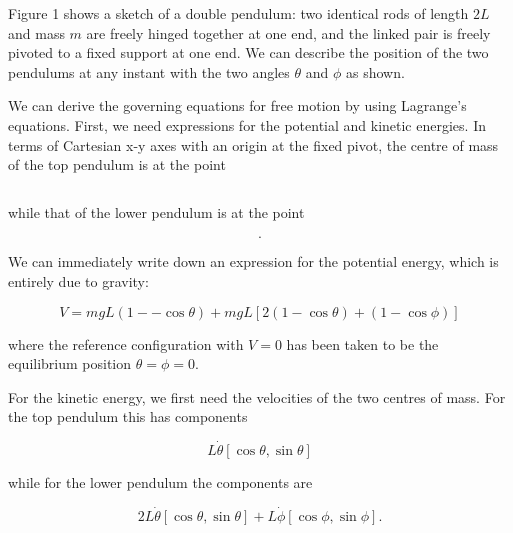   Figure 1 shows a sketch of a double pendulum: two identical rods of length 
  $2L$ and mass $m$ are freely hinged together at one end, and the linked pair 
  is freely pivoted to a fixed support at one end. We can describe the position 
  of the two pendulums at any instant with the two angles $\theta$ and $\phi$ 
  as shown. 


  We can derive the governing equations for free motion by using Lagrange's 
  equations. First, we need expressions for the potential and kinetic energies. 
  In terms of Cartesian x-y axes with an origin at the fixed pivot, the centre 
  of mass of the top pendulum is at the point 

  \begin{equation*}[L \sin \theta, -L \cos \theta] \tag{1}\end{equation*} 

  \noindent{}while that of the lower pendulum is at the point 

  \begin{equation*}[2L \sin \theta + L \sin \phi, -2L \cos \theta -- L \cos 
  \phi]. \tag{2}\end{equation*} 

  We can immediately write down an expression for the potential energy, which 
  is entirely due to gravity: 

  \begin{equation*}V=mgL(1 -- \cos \theta) +mgL[2(1- \cos \theta) + (1-\cos 
  \phi)] \tag{3}\end{equation*} 

  \noindent{}where the reference configuration with $V=0$ has been taken to be 
  the equilibrium position $\theta=\phi=0$. 

  For the kinetic energy, we first need the velocities of the two centres of 
  mass. For the top pendulum this has components 

  \begin{equation*}L \dot{\theta} [\cos \theta, \sin \theta] 
  \tag{4}\end{equation*} 

  \noindent{}while for the lower pendulum the components are 

  \begin{equation*}2L \dot{\theta} [\cos \theta, \sin \theta] + L \dot{\phi} 
  [\cos \phi, \sin \phi]. \tag{5}\end{equation*} 

